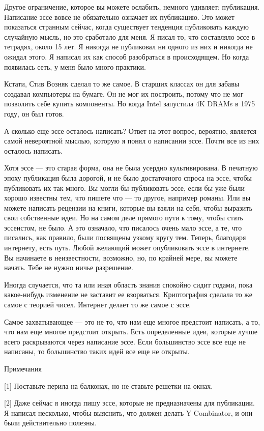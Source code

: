 \documentclass[ebook,12pt,oneside,openany]{memoir}
\begin{document}
Другое ограничение, которое вы можете ослабить, немного удивляет:
публикация. Написание эссе вовсе не обязательно означает их
публикацию. Это может показаться странным сейчас, когда существует
тенденция публиковать каждую случайную мысль, но это сработало для
меня. Я писал то, что составляло эссе в тетрадях, около 15 лет. Я
никогда не публиковал ни одного из них и никогда не ожидал этого. Я
написал их как способ разобраться в происходящем. Но когда появилась
сеть, у меня было много практики.

Кстати, Стив Возняк сделал то же самое. В старших классах он для
забавы создавал компьютеры на бумаге. Он не мог их построить, потому
что не мог позволить себе купить компоненты. Но когда Intel запустила
4K DRAMs в 1975 году, он был готов.

А сколько еще эссе осталось написать? Ответ на этот вопрос, вероятно,
является самой невероятной мыслью, которую я понял о написании эссе.
Почти все из них осталось написать.

Хотя эссе — это старая форма, она не была усердно культивирована. В
печатную эпоху публикация была дорогой, и не было достаточного спроса
на эссе, чтобы публиковать их так много. Вы могли бы публиковать эссе,
если бы уже были хорошо известны тем, что пишете что — то другое,
например романы. Или вы можете написать рецензии на книги, которые вы
взяли на себя, чтобы выразить свои собственные идеи. Но на самом деле
прямого пути к тому, чтобы стать эссеистом, не было. А это означало,
что писалось очень мало эссе, а те, что писались, как правило, были
посвящены узкому кругу тем. Теперь, благодаря интернету, есть путь.
Любой желающий может опубликовать эссе в интернете. Вы начинаете в
неизвестности, возможно, но, по крайней мере, вы можете начать. Тебе
не нужно ничье разрешение.

Иногда случается, что та или иная область знания спокойно сидит
годами, пока какое-нибудь изменение не заставит ее взорваться.
Криптография сделала то же самое с теорией чисел. Интернет делает то
же самое с эссе.

Самое захватывающее — это не то, что нам еще многое предстоит
написать, а то, что нам еще многое предстоит открыть. Есть
определенные идеи, которые лучше всего раскрываются через написание
эссе. Если большинство эссе все еще не написаны, то большинство таких
идей все еще не открыты.

Примечания

[1] Поставьте перила на балконах, но не ставьте решетки на окнах.

[2] Даже сейчас я иногда пишу эссе, которые не предназначены для
публикации. Я написал несколько, чтобы выяснить, что должен делать Y
Combinator, и они были действительно полезны.
\end{document}
